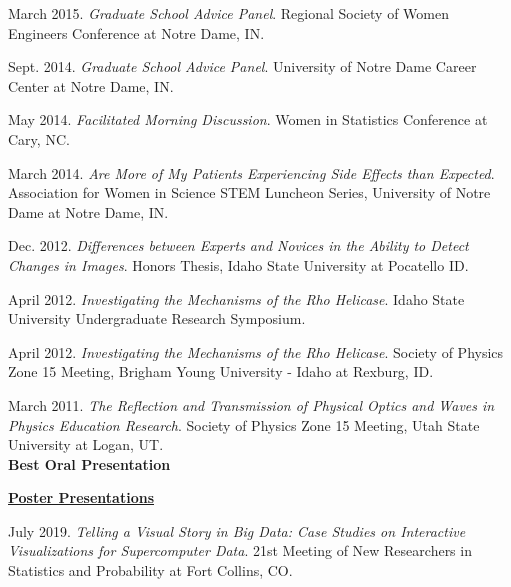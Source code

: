 \documentclass[11pt, letterpaper, roman]{moderncv} %
\begin{document}
\begin{etaremune}[topsep=0pt, itemsep=6pt, partopsep=0pt, parsep=0pt]
  \item March 2015. \textit{Graduate School Advice Panel}.  Regional Society of Women Engineers Conference at Notre Dame, IN.
  
  \item Sept. 2014. \textit{Graduate School Advice Panel}.  University of Notre Dame Career Center at Notre Dame, IN.
  
  \item May 2014. \textit{Facilitated Morning Discussion}. Women in Statistics Conference at Cary, NC.
  
  \item March 2014. \textit{Are More of My Patients Experiencing Side Effects than Expected}. Association for Women in Science STEM Luncheon Series, University of Notre Dame at Notre Dame, IN.
  
  \item Dec. 2012. \textit{Differences between Experts and Novices in the Ability to Detect Changes in Images}. Honors Thesis, Idaho State University at Pocatello ID.

  \item April 2012. \textit{Investigating the Mechanisms of the Rho Helicase}. Idaho State University Undergraduate Research Symposium.

  \item April 2012. \textit{Investigating the Mechanisms of the Rho Helicase}. Society of Physics Zone 15 Meeting, Brigham Young University - Idaho at Rexburg, ID.

  \item March 2011. \textit{The Reflection and Transmission of Physical Optics and Waves in Physics Education Research}. Society of Physics Zone 15 Meeting, Utah State University at Logan, UT.\\
  \textbf{Best Oral Presentation}
  

\vspace{5pt}

\hspace{-0.30in}\underline{\textbf{\large Poster Presentations}}\normalsize
  \item July 2019. \textit{Telling a Visual Story in Big Data: Case Studies on Interactive Visualizations for Supercomputer Data}. 21st Meeting of New Researchers in Statistics and Probability at Fort Collins, CO.


\end{etaremune}
\end{document}
